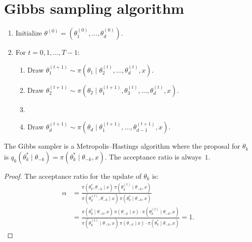 \section{Gibbs sampling algorithm}

\begin{algorithme}[title=\textbf{Gibbs sampler}]
\begin{enumerate}
  \item Initialize $\theta^{(0)} = (\theta_1^{(0)}, \ldots, \theta_d^{(0)})$.
  \item For $t = 0, 1, \ldots, T-1$:
  \begin{enumerate}
    \item Draw $\theta_1^{(t+1)} \sim \pi(\theta_1 \mid \theta_2^{(t)}, \ldots, \theta_d^{(t)}, x)$.
    \item Draw $\theta_2^{(t+1)} \sim \pi(\theta_2 \mid \theta_1^{(t+1)}, \theta_3^{(t)}, \ldots, \theta_d^{(t)}, x)$.
    \item[$\vdots$]
    \item Draw $\theta_d^{(t+1)} \sim \pi(\theta_d \mid \theta_1^{(t+1)}, \ldots, \theta_{d-1}^{(t+1)}, x)$.
  \end{enumerate}
\end{enumerate}
\end{algorithme}

\begin{theorem}
The Gibbs sampler is a Metropolis--Hastings algorithm where the
proposal for $\theta_k$ is
$q_k(\theta_k^* \mid \theta_{-k}) = \pi(\theta_k^* \mid \theta_{-k}, x)$.
The acceptance ratio is always~$1$.
\end{theorem}

\begin{proof}
The acceptance ratio for the update of $\theta_k$ is:
\begin{align*}
  \alpha &= \frac{\pi(\theta_k^*, \theta_{-k} \mid x)\,\pi(\theta_k^{(t)} \mid \theta_{-k}, x)}
                 {\pi(\theta_k^{(t)}, \theta_{-k} \mid x)\,\pi(\theta_k^* \mid \theta_{-k}, x)} \\
  &= \frac{\pi(\theta_k^* \mid \theta_{-k}, x)\,\pi(\theta_{-k} \mid x)
            \cdot \pi(\theta_k^{(t)} \mid \theta_{-k}, x)}
          {\pi(\theta_k^{(t)} \mid \theta_{-k}, x)\,\pi(\theta_{-k} \mid x)
            \cdot \pi(\theta_k^* \mid \theta_{-k}, x)}
  = 1.
\end{align*}
\end{proof}

